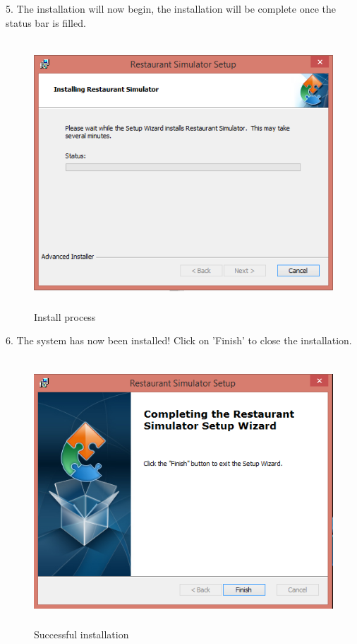 \begin{landscape}
5. The installation will now begin, the installation will be complete once the status bar is filled.

\begin{figure}[H]
    \includegraphics[height = 10cm]{./Manual/images/install5} 
    \caption{Install process} \label{fig:install5}
\end{figure}

6. The system has now been installed! Click on 'Finish' to close the installation.

\begin{figure}[H]
    \includegraphics[height = 10cm]{./Manual/images/install6} 
    \caption{Successful installation} \label{fig:install6}
\end{figure}


\end{landscape}
